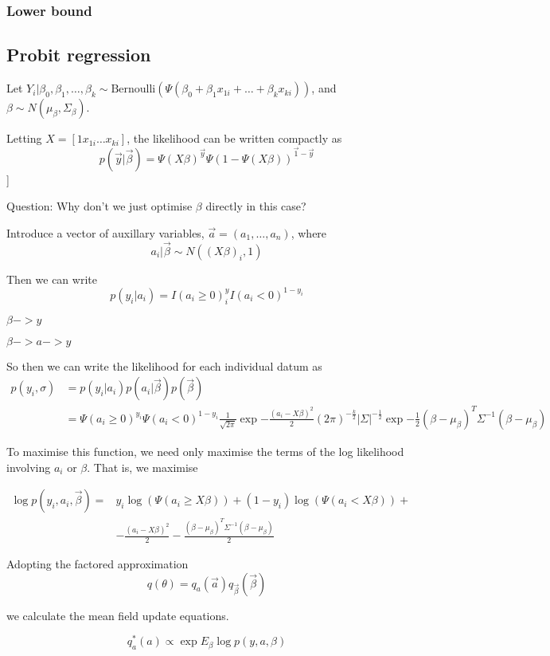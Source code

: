 \documentclass{amsart}
\newcommand{\Bernoulli}[1]{\text{Bernoulli} \left( #1 \right)}
\begin{document}
\subsubsection{Lower bound}

\subsection{Probit regression}
Let $Y_i|\beta_0, \beta_1, \ldots, \beta_k \sim \Bernoulli{\Psi(\beta_0 + \beta_1 x_{1i} + \ldots + \beta_k x_{ki})}$, and $\beta \sim N(\mu_\beta, \Sigma_\beta)$.

Letting $X = [1 x_{1i} \ldots x_{ki}]$, the likelihood can be written compactly as
\[
p(\vec{y}|\vec{\beta}) = \Psi(X \beta)^{\vec{y}} \Psi(1 - \Psi(X \beta))^{\vec{1} - \vec{y}}
\]]

Question: Why don't we just optimise $\beta$ directly in this case?

Introduce a vector of auxillary variables, $\vec{a} = (a_1, \ldots, a_n)$, where
\[
a_i | \vec{\beta} \sim N((X\beta)_i, 1)
\]

Then we can write
\[
p(y_i|a_i) = I(a_i \geq 0)^y_i I(a_i < 0)^{1-y_i}
\]

$\beta -> y$

$\beta -> a -> y$

So then we can write the likelihood for each individual datum as
\begin{align*}
	p(y_i, \sigma) &= p(y_i|a_i) p(a_i|\vec{\beta}) p(\vec{\beta}) \\
	&= \Psi(a_i \geq 0)^{y_i} \Psi(a_i < 0)^{1 - y_i} \frac{1}{\sqrt{2 \pi}} \exp{- \frac{(a_i - X \beta)^2}{2}} \left( 2 \pi \right)^{-\frac{k}{2}} |\Sigma|^{-\frac{1}{2}} \exp{-\frac{1}{2} (\beta - \mu_\beta)^T \Sigma^{-1} (\beta - \mu_\beta)}
\end{align*}

To maximise this function, we need only maximise the terms of the log likelihood
involving $a_i$ or $\beta$. That is, we maximise

\begin{align*}
\log{p(y_i, a_i, \vec{\beta})} =& y_i \log{(\Psi(a_i \geq X \beta))} + (1 - y_i) \log{(\Psi(a_i < X \beta))} + \\
&- \frac{(a_i - X \beta)^2}{2} - \frac{(\beta - \mu_\beta)^T \Sigma^{-1} (\beta - \mu_\beta)}{2}
\end{align*}

Adopting the factored approximation
\[
q(\theta) = q_a(\vec{a}) q_{\vec{\beta}}(\vec{\beta})
\]

we calculate the mean field update equations.

\[
q_a^*(a) \propto \exp{E_\beta \log{p(y, a, \beta)}}
\]
\end{document}
